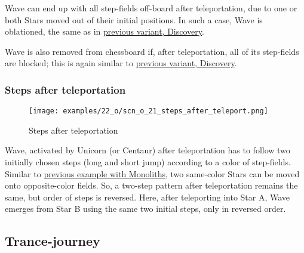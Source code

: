 Wave can end up with all step-fields off-board after teleportation, due to one or
both Stars moved out of their initial positions. In such a case, Wave is oblationed,
the same as in
\hyperref[fig:scn_d_12_wave_teleported_off_board]{previous variant, Discovery}.

Wave is also removed from chessboard if, after teleportation, all of its step-fields
are blocked; this is again similar to
\hyperref[fig:scn_d_11_teleported_wave_blocked]{previous variant, Discovery}.

\clearpage %

\subsubsection*{Steps after teleportation}
\label{sec:One/Starchild/Activating Wave/Steps after teleportation}

\vspace*{-1.5\baselineskip}
\noindent
\begin{figure}[!h]
\texttt{[image: examples/22\_o/scn\_o\_21\_steps\_after\_teleport.png]}
\vspace*{-1.4\baselineskip}
\caption{Steps after teleportation}
\label{fig:scn_o_21_steps_after_teleport}
\end{figure}

\vspace*{-0.5\baselineskip}
Wave, activated by Unicorn (or Centaur) after teleportation has to follow two initially
chosen steps (long and short jump) according to a color of step-fields. Similar to
\hyperref[fig:scn_d_15_steps_after_teleport_init]{previous example with Monoliths},
two same-color Stars can be moved onto opposite-color fields. So, a two-step pattern
after teleportation remains the same, but order of steps is reversed. Here, after
teleporting into Star A, Wave emerges from Star B using the same two initial steps,
only in reversed order.

\clearpage %

\subsection*{Trance-journey}
\label{sec:One/Starchild/Trance-journey}

